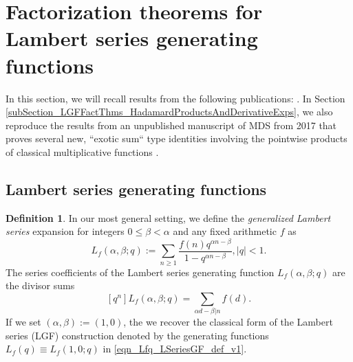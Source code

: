 \documentclass[12pt,reqno,a4letter]{article}
\numberwithin{figure}{section}
\numberwithin{table}{section}
\numberwithin{equation}{section}
\theoremstyle{plain}
\numberwithin{theorem}{section}
\theoremstyle{definition}
\newtheorem{definition}[theorem]{Definition}
\begin{document}
\clearpage
\newpage

\section{Factorization theorems for Lambert series generating functions} 
\label{Section_LGFFactTheorems_PriorWork} 

In this section, we will recall results from the following publications: 
\cite{AA,MERCA-SCHMIDT-RAMJ}. 
In Section \ref{subSection_LGFFactThms_HadamardProductsAndDerivativeExps}, 
we also reproduce the results from an unpublished 
manuscript of MDS from 2017 that proves several new, ``exotic sum`` 
type identities involving the pointwise products of 
classical multiplicative functions \cite{MDS-HADAMARD-FACTTHMS}. 

\subsection{Lambert series generating functions} 

\begin{definition}
In our most general setting, we define the \emph{generalized Lambert series} expansion 
for integers $0 \leq \beta < \alpha$ and any fixed arithmetic $f$ as 
\[
L_f(\alpha, \beta; q) := \sum_{n \geq 1} \frac{f(n) q^{\alpha n - \beta}}{1-q^{\alpha n-\beta}},  
     |q| < 1. 
\]
The series coefficients of the Lambert series generating function $L_f(\alpha, \beta; q)$ 
are the divisor sums 
\[
[q^n] L_f(\alpha, \beta; q) = \sum_{\alpha d-\beta| n} f(d). 
\]
If we set $(\alpha, \beta) := (1, 0)$, the we recover the classical form of the Lambert series (LGF) 
construction denoted by the generating functions 
$L_f(q) \equiv L_f(1, 0; q)$ in \eqref{eqn_Lfq_LSeriesGF_def_v1}.
\end{definition}
\end{document}
